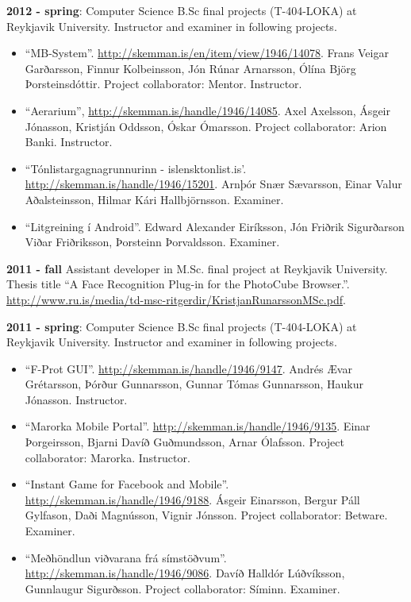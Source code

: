 \textbf{2012 - spring}:
Computer Science B.Sc final projects (T-404-LOKA) at Reykjavik University. Instructor and examiner in following projects.

\begin{itemize}
\item ``MB-System''. \url{http://skemman.is/en/item/view/1946/14078}. Frans Veigar Garðarsson, Finnur Kolbeinsson, Jón Rúnar Arnarsson, Ólína Björg Þorsteinsdóttir. Project collaborator: Mentor. Instructor.

\item ``Aerarium'', \url{http://skemman.is/handle/1946/14085}. Axel Axelsson, Ásgeir Jónasson, Kristján Oddsson, Óskar Ómarsson. Project collaborator: Arion Banki. Instructor.

\item ``Tónlistargagnagrunnurinn - islensktonlist.is'. \url{http://skemman.is/handle/1946/15201}. Arnþór Snær Sævarsson, Einar Valur Aðalsteinsson, Hilmar Kári Hallbjörnsson. Examiner.

\item ``Litgreining í Android''. Edward Alexander Eiríksson, Jón Friðrik Sigurðarson
Viðar Friðriksson, Þorsteinn Þorvaldsson. Examiner.
\end{itemize}


\textbf{2011 - fall}
Assistant developer in M.Sc. final project at Reykjavik University. Thesis title ``A Face
Recognition Plug-in for the PhotoCube Browser.''. \url{http://www.ru.is/media/td-msc-ritgerdir/KristjanRunarssonMSc.pdf}.


\textbf{2011 - spring}:
Computer Science B.Sc final projects (T-404-LOKA) at Reykjavik University. Instructor and examiner in following projects.

\begin{itemize}
\item ``F-Prot GUI''. \url{http://skemman.is/handle/1946/9147}. Andrés Ævar Grétarsson, Þórður Gunnarsson, Gunnar Tómas Gunnarsson, Haukur Jónasson. Instructor.

\item ``Marorka Mobile Portal''. \url{http://skemman.is/handle/1946/9135}. Einar Þorgeirsson, Bjarni Davíð Guðmundsson, Arnar Ólafsson. Project collaborator: Marorka. Instructor.

\item ``Instant Game for Facebook and Mobile''. \url{http://skemman.is/handle/1946/9188}. Ásgeir Einarsson, Bergur Páll Gylfason, Daði Magnússon, Vignir Jónsson. Project collaborator: Betware. Examiner.

\item ``Meðhöndlun viðvarana frá símstöðvum''. \url{http://skemman.is/handle/1946/9086}. Davíð Halldór Lúðvíksson, Gunnlaugur Sigurðsson. Project collaborator: Síminn. Examiner.
\end{itemize}
